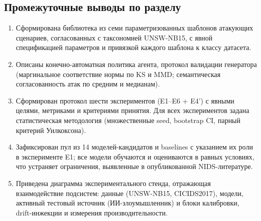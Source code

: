 \subsection{Промежуточные выводы по разделу}

\begin{enumerate}
    \item Сформирована библиотека из семи параметризованных шаблонов
    атакующих сценариев, согласованных с таксономией UNSW-NB15, с явной
    спецификацией параметров и привязкой каждого шаблона к классу датасета.
    \item Описаны конечно-автоматная политика агента, протокол валидации
    генератора (маргинальное соответствие нормы по KS и MMD;
    семантическая согласованность атак по средним и медианам).
    \item Сформирован протокол шести экспериментов (E1--E6 + E4') с
    явными целями, метриками и критериями принятия. Для всех экспериментов
    задана статистическая методология (множественные seed, bootstrap CI,
    парный критерий Уилкоксона).
    \item Зафиксирован пул из 14 моделей-кандидатов и baselines с
    указанием их роли в эксперименте E1; все модели обучаются и
    оцениваются в равных условиях, что устраняет ограничения, выявленные
    в опубликованной NIDS-литературе.
    \item Приведена диаграмма экспериментального стенда, отражающая
    взаимодействие подсистем: данные (UNSW-NB15, CICIDS2017),
    модели, активный тестовый источник (ИИ-злоумышленник) и блоки
    калибровки, drift-инжекции и измерения производительности.
\end{enumerate}
